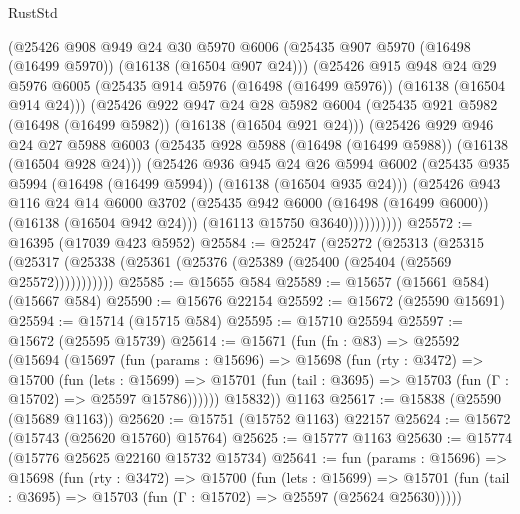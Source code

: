 \begin{lexlean}{RustStd}
\begin{coremodule}
          (@25426
            @908
            @949
            @24
            @30
            @5970
            @6006
            (@25435 @907 @5970 (@16498 (@16499 @5970)) (@16138 (@16504 @907 @24)))
            (@25426
              @915
              @948
              @24
              @29
              @5976
              @6005
              (@25435 @914 @5976 (@16498 (@16499 @5976)) (@16138 (@16504 @914 @24)))
              (@25426
                @922
                @947
                @24
                @28
                @5982
                @6004
                (@25435 @921 @5982 (@16498 (@16499 @5982)) (@16138 (@16504 @921 @24)))
                (@25426
                  @929
                  @946
                  @24
                  @27
                  @5988
                  @6003
                  (@25435 @928 @5988 (@16498 (@16499 @5988)) (@16138 (@16504 @928 @24)))
                  (@25426
                    @936
                    @945
                    @24
                    @26
                    @5994
                    @6002
                    (@25435 @935 @5994 (@16498 (@16499 @5994)) (@16138 (@16504 @935 @24)))
                    (@25426
                      @943
                      @116
                      @24
                      @14
                      @6000
                      @3702
                      (@25435 @942 @6000 (@16498 (@16499 @6000)) (@16138 (@16504 @942 @24)))
                      (@16113 @15750 @3640))))))))))
@25572 := @16395 (@17039 @423 @5952)
@25584 := @25247
    (@25272
      (@25313
        (@25315 (@25317 (@25338 (@25361 (@25376 (@25389 (@25400 (@25404 (@25569 @25572)))))))))))
@25585 := @15655 @584
@25589 := @15657 (@15661 @584) (@15667 @584)
@25590 := @15676 @22154
@25592 := @15672 (@25590 @15691)
@25594 := @15714 (@15715 @584)
@25595 := @15710 @25594
@25597 := @15672 (@25595 @15739)
@25614 := @15671
    (fun (fn : @83) =>
    @25592
      (@15694
        (@15697
          (fun (params : @15696) =>
          @15698
            (fun (rty : @3472) =>
            @15700
              (fun (lets : @15699) =>
              @15701 (fun (tail : @3695) => @15703 (fun (Γ : @15702) => @25597 @15786))))))
        @15832))
    @1163
@25617 := @15838 (@25590 (@15689 @1163))
@25620 := @15751 (@15752 @1163) @22157
@25624 := @15672 (@15743 (@25620 @15760) @15764)
@25625 := @15777 @1163
@25630 := @15774 (@15776 @25625 @22160 @15732 @15734)
@25641 := fun (params : @15696) =>
  @15698
    (fun (rty : @3472) =>
    @15700
      (fun (lets : @15699) =>
      @15701 (fun (tail : @3695) => @15703 (fun (Γ : @15702) => @25597 (@25624 @25630)))))

\end{coremodule}
\end{lexlean}
